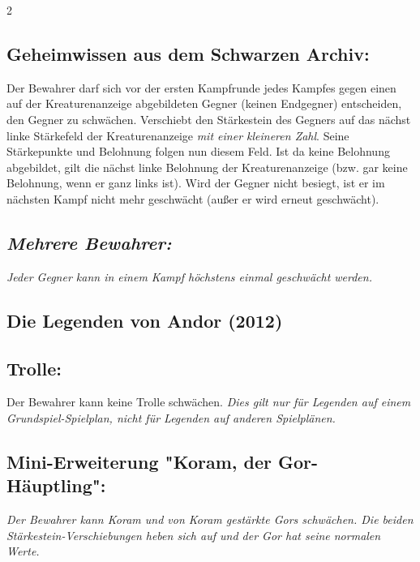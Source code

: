 \documentclass[10pt, a4paper, oneside]{book}
\newcommand{\fan}[1]{\textit{#1}}
\begin{document}
\begin{multicols*}{2}
\begin{nobgcolor}
\subsection{Geheimwissen aus dem Schwarzen Archiv:}

Der Bewahrer darf sich vor der ersten Kampfrunde jedes Kampfes gegen einen auf der Kreaturenanzeige abgebildeten Gegner (keinen Endgegner) entscheiden, den Gegner zu schwächen. 
\supercite{nh-begleitheft}
Verschiebt den Stärkestein des Gegners auf das nächst linke Stärkefeld der Kreaturenanzeige \fan{mit einer kleineren Zahl}. Seine Stärkepunkte und Belohnung folgen nun diesem Feld. Ist da keine Belohnung abgebildet, gilt die nächst linke Belohnung der Kreaturenanzeige\supercite{dridn-begleitheft} (bzw. gar keine Belohnung, wenn er ganz links ist).
Wird der Gegner nicht besiegt, ist er im nächsten Kampf nicht mehr geschwächt (außer er wird erneut geschwächt).





\subsection{\fan{Mehrere Bewahrer:}}

\fan{Jeder Gegner kann in einem Kampf höchstens einmal geschwächt werden.}

\end{nobgcolor}



\begin{bgcolor}
\section{Die Legenden von Andor (2012)}

\subsection{Trolle:}

Der Bewahrer kann keine Trolle schwächen. \fan{Dies gilt nur für Legenden auf einem Grundspiel-Spielplan, nicht für Legenden auf anderen Spielplänen.}



\subsection{Mini-Erweiterung "Koram, der Gor-Häuptling":}

\fan{Der Bewahrer kann Koram und von Koram gestärkte Gors schwächen. Die beiden Stärkestein-Verschiebungen heben sich auf und der Gor hat seine normalen Werte.}




\end{bgcolor}
\end{multicols*}
\end{document}
